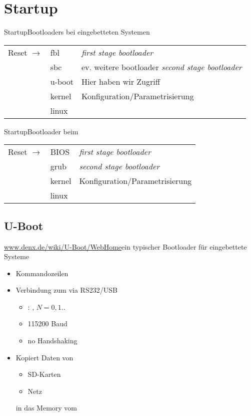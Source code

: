 \section{Startup}

\begin{frame}{Startup}{Bootloaders bei eingebetteten Systemen}
\begin{tabular}{ll|l}
 Reset $\to$ & fbl 		& {\em first stage bootloader}\\
 			 & sbc  	& ev. weitere bootloader {\em second stage bootloader}\\
			 & u-boot	& Hier haben wir Zugriff\\
			 & kernel	& Konfiguration/Parametrisierung \\
			 & linux	& 
\end{tabular}
\end{frame}

\begin{frame}{Startup}{Bootloader beim \host}
\begin{tabular}{ll|l}
 Reset $\to$ & BIOS 	& {\em first stage bootloader}\\
 			 & grub  	& {\em second stage bootloader}\\
			 & kernel	& Konfiguration/Parametrisierung \\
			 & linux	& 
\end{tabular}
\end{frame}

\subsection{U-Boot}
\begin{frame}{\url{www.denx.de/wiki/U-Boot/WebHome}}{ein typischer Bootloader für eingebettete Systeme}
 \begin{itemize}
  \item Kommandozeilen
  \item Verbindung zum \host via RS232/USB
  \begin{itemize}
   \item \host: , $N=0,1..$
   \item 115200 Baud 
   \item {\Large no} Handshaking
  \end{itemize}
  \item Kopiert Daten von
  \begin{itemize}
   \item SD-Karten
   \item Netz
  \end{itemize}
  in das Memory vom \targetS
 \end{itemize}
\end{frame}

